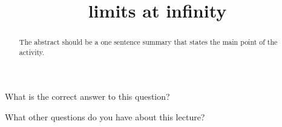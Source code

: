 \documentclass{ximera}
\title{limits at infinity}
\begin{document}
\begin{abstract}
  The abstract should be a one sentence summary that states the main point of the activity.
\end{abstract}

\maketitle

\begin{question}
  What is the correct answer to this question?

  \begin{solution}
    \begin{multiple-choice}
    \end{multiple-choice}  
  \end{solution}
\end{question}

What other questions do you have about this lecture?
\begin{free-response}
\end{free-response}
\end{document}
